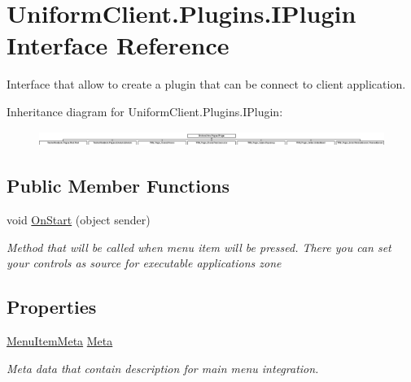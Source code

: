 \hypertarget{interface_uniform_client_1_1_plugins_1_1_i_plugin}{}\section{Uniform\+Client.\+Plugins.\+I\+Plugin Interface Reference}
\label{interface_uniform_client_1_1_plugins_1_1_i_plugin}


Interface that allow to create a plugin that can be connect to client application.  


Inheritance diagram for Uniform\+Client.\+Plugins.\+I\+Plugin\+:\begin{figure}[H]
\begin{center}
\leavevmode
\includegraphics[height=0.496894cm]{d4/d25/interface_uniform_client_1_1_plugins_1_1_i_plugin}
\end{center}
\end{figure}
\subsection*{Public Member Functions}
\begin{DoxyCompactItemize}
\item 
void \mbox{\hyperlink{interface_uniform_client_1_1_plugins_1_1_i_plugin_a1ca2220c7ce4a23f8f41af10efccf328}{On\+Start}} (object sender)
\begin{DoxyCompactList}\small\item\em Method that will be called when menu item will be pressed. There you can set your controls as source for executable application\textquotesingle{}s zone \end{DoxyCompactList}\end{DoxyCompactItemize}
\subsection*{Properties}
\begin{DoxyCompactItemize}
\item 
\mbox{\hyperlink{class_uniform_client_1_1_plugins_1_1_menu_item_meta}{Menu\+Item\+Meta}} \mbox{\hyperlink{interface_uniform_client_1_1_plugins_1_1_i_plugin_aa49e267e66a3d697ded460d9281dcc3a}{Meta}}
\begin{DoxyCompactList}\small\item\em Meta data that contain description for main menu integration. \end{DoxyCompactList}\end{DoxyCompactItemize}



